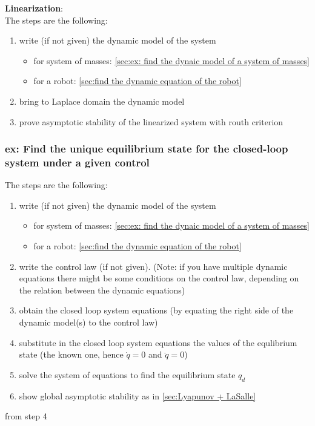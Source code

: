 \documentclass[a4paper,12pt]{article}
\begin{document}
\textbf{Linearization}:\\
The steps are the following:
\begin{enumerate}
    \item write (if not given) the dynamic model of the system 
    \begin{itemize}
        \item for system of masses: \ref{sec:ex: find the dynaic model of a system of masses}
        \item for a robot: \ref{sec:find the dynamic equation of the robot}
    \end{itemize}
    \item bring to Laplace domain the dynamic model
    \item prove asymptotic stability of the linearized system
    with routh criterion 
\end{enumerate}
\subsubsection{ex:  Find the unique equilibrium state
  for the closed-loop system under a given control}
The steps are the following:
\begin{enumerate}
    \item write (if not given) the dynamic model of the system 
    \begin{itemize}
        \item for system of masses: \ref{sec:ex: find the dynaic model of a system of masses}
        \item for a robot: \ref{sec:find the dynamic equation of the robot}
    \end{itemize}
    \item write the control law (if not given). (Note: if you have multiple
    dynamic equations there might be some conditions on the control law, depending
    on the relation between the dynamic equations)
    \item obtain the closed loop system equations (by 
    equating the right side of the dynamic model(s) to the control law)
    \item substitute in the closed loop system equations the
    values of the equlibrium state (the known one, hence $\dot{q}=0$ and 
    $\ddot{q}=0$)
    \item solve the system of equations to find the equilibrium state $q_d$
    \item show global asymptotic stability as in \ref{sec:Lyapunov + LaSalle}
\end{enumerate}from step 4
\end{document}
